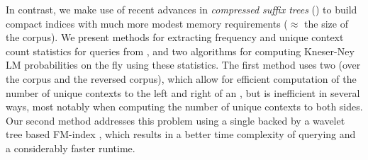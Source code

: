 %
%
%
%
 
In contrast, we make use of recent advances in  \emph{compressed suffix trees} (\CSTs) \cite{rno-talg11} 
to build compact indices with much more modest memory requirements ($\approx$ the size of the corpus).
We present methods for extracting frequency and unique context count
statistics for \ngram queries from \CSTs,  and two algorithms for
computing Kneser-Ney LM probabilities on the fly using these statistics.
The first method uses two \CSTs (over the corpus and the reversed corpus),
which allow for efficient computation of the number of unique contexts to the left
and right of an \ngram, 
but is inefficient in several ways, most notably when computing the
number of unique contexts to both sides.
Our second method addresses this problem using a single \CST backed by
a wavelet tree based FM-index \cite{fmmn-talg07}, which results in a better time
complexity of querying and a considerably faster runtime.
 
